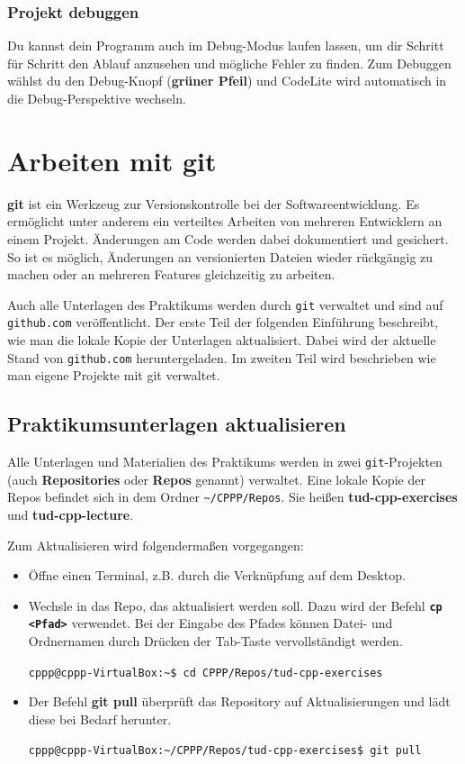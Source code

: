 \subsubsection{Projekt debuggen}
Du kannst dein Programm auch im Debug-Modus laufen lassen, um dir Schritt für Schritt den Ablauf anzusehen und mögliche Fehler zu finden.
Zum Debuggen wählst du den Debug-Knopf (\textbf{grüner Pfeil}) und CodeLite wird automatisch in die Debug-Perspektive wechseln. 

\section{Arbeiten mit git}

\textbf{git} ist ein Werkzeug zur Versionskontrolle bei der Softwareentwicklung.
Es ermöglicht unter anderem ein verteiltes Arbeiten von mehreren Entwicklern an einem Projekt.
Änderungen am Code werden dabei dokumentiert und gesichert.
So ist es möglich, Änderungen an versionierten Dateien wieder rückgängig zu machen oder an mehreren Features gleichzeitig zu arbeiten.

Auch alle Unterlagen des Praktikums werden durch \texttt{git} verwaltet und sind auf \texttt{github.com} veröffentlicht.
Der erste Teil der folgenden Einführung beschreibt, wie man die lokale Kopie der Unterlagen aktualisiert.
Dabei wird der aktuelle Stand von \texttt{github.com} heruntergeladen.
Im zweiten Teil wird beschrieben wie man eigene Projekte mit git verwaltet.

\subsection{Praktikumsunterlagen aktualisieren}
Alle Unterlagen und Materialien des Praktikums werden in zwei \texttt{git}-Projekten (auch \textbf{Repositories} oder \textbf{Repos} genannt) verwaltet.
Eine lokale Kopie der Repos befindet sich in dem Ordner \texttt{\textasciitilde/CPPP/Repos}.
Sie heißen \textbf{tud-cpp-exercises} und \textbf{tud-cpp-lecture}.

Zum Aktualisieren wird folgendermaßen vorgegangen:

\begin{itemize}
\item Öffne einen Terminal, z.B. durch die Verknüpfung auf dem Desktop.
\item Wechsle in das Repo, das aktualisiert werden soll.
Dazu wird der Befehl \textbf{\texttt{cp <Pfad>}} verwendet.
Bei der Eingabe des Pfades können Datei- und Ordnernamen durch Drücken der Tab-Taste vervollständigt werden.

\texttt{cppp@cppp-VirtualBox:\textasciitilde\$ cd CPPP/Repos/tud-cpp-exercises}

\item Der Befehl \textbf{git pull} überprüft das Repository auf Aktualisierungen und lädt diese bei Bedarf herunter.

\texttt{cppp@cppp-VirtualBox:\textasciitilde/CPPP/Repos/tud-cpp-exercises\$ git pull}
\end{itemize}

